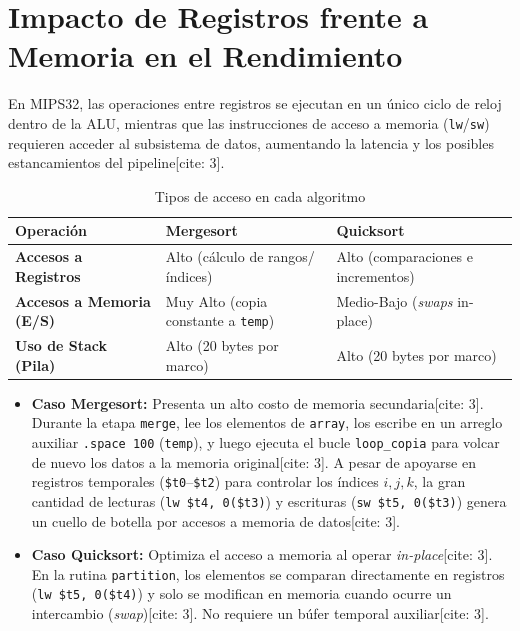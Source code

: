\documentclass[12pt,a4paper]{article}
\begin{document}
\section{Impacto de Registros frente a Memoria en el Rendimiento}

En MIPS32, las operaciones entre registros se ejecutan en un único ciclo de reloj dentro de la ALU, mientras que las instrucciones de acceso a memoria (\texttt{lw}/\texttt{sw}) requieren acceder al subsistema de datos, aumentando la latencia y los posibles estancamientos del pipeline[cite: 3].

\begin{table}[h!]
\centering
\caption{Tipos de acceso en cada algoritmo}
\vspace{0.2cm}
\begin{tabular}{lll}
\toprule
\textbf{Operación} & \textbf{Mergesort} & \textbf{Quicksort} \\
\midrule
\textbf{Accesos a Registros} & Alto (cálculo de rangos/índices) & Alto (comparaciones e incrementos) \\
\textbf{Accesos a Memoria (E/S)} & Muy Alto (copia constante a \texttt{temp}) & Medio-Bajo (\textit{swaps} in-place) \\
\textbf{Uso de Stack (Pila)} & Alto (20 bytes por marco) & Alto (20 bytes por marco) \\
\bottomrule
\end{tabular}
\end{table}

\begin{itemize}
    \item \textbf{Caso Mergesort:} Presenta un alto costo de memoria secundaria[cite: 3]. Durante la etapa \texttt{merge}, lee los elementos de \texttt{array}, los escribe en un arreglo auxiliar \texttt{.space 100} (\texttt{temp}), y luego ejecuta el bucle \texttt{loop\_copia} para volcar de nuevo los datos a la memoria original[cite: 3]. A pesar de apoyarse en registros temporales (\texttt{\$t0}--\texttt{\$t2}) para controlar los índices $i, j, k$, la gran cantidad de lecturas (\texttt{lw \$t4, 0(\$t3)}) y escrituras (\texttt{sw \$t5, 0(\$t3)}) genera un cuello de botella por accesos a memoria de datos[cite: 3].
    \item \textbf{Caso Quicksort:} Optimiza el acceso a memoria al operar \textit{in-place}[cite: 3]. En la rutina \texttt{partition}, los elementos se comparan directamente en registros (\texttt{lw \$t5, 0(\$t4)}) y solo se modifican en memoria cuando ocurre un intercambio (\textit{swap})[cite: 3]. No requiere un búfer temporal auxiliar[cite: 3].
\end{itemize}
\end{document}
